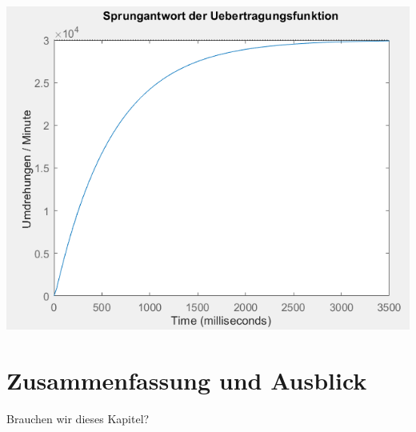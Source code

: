 \documentclass[            %
draft = false,             		%
paper = A4,                		%
pagesize = pdftex,         		%
fontsize = 10pt,           		%
DIV=15,                    		%
twoside = false,           		%
twocolumn = false,         		%
parskip = full,           		%
chapterprefix = false,      		%
appendixprefix = true,     		%
headinclude = false,       		%
footinclude = false,       		%
mpinclude = false,         		%
numbers = auto,            		%
cleardoublepage = plain,   		%
footnotes = multiple,      		%
titlepage = true,          		%
headings = normal,         		%
open = right,              		%
bibliography = openstyle,  		%
listof = chaptergapline,   		%
overfullrule = true,
]{scrbook}
\newcommand{\addtotoc}[1]{
\addcontentsline{toc}{chapter}{
   \texorpdfstring{
      \MakeUppercase{#1}
   }{#1}
   }
}
\begin{document}
\begin{center}
   \begin{minipage}[b]{0.9\textwidth}
      \includegraphics[scale=0.7]{Bilder/Sprungantwort_Gegenkopplung.PNG}
      \label{fig:Sprungantwort_Gegenkopplung} 
   \end{minipage}
\end{center}


\newpage
{\let\clearpage\relax \chapter{Zusammenfassung und Ausblick}} \label{chpt:Conclusion}

Brauchen wir dieses Kapitel?









%
\end{document}
